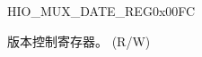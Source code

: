 \begin{register}{H}{IO\_MUX\_DATE\_REG}{0x00FC}\label{regdesc:IOMUXDATEREG}
%
%
\regnewline%
\begin{regdesc}\begin{reglist}
\label{fielddesc:IOMUXREGDATE}\item [IO\_MUX\_DATE\_REG] 版本控制寄存器。 (R/W)
\end{reglist}\end{regdesc}
\end{register}


